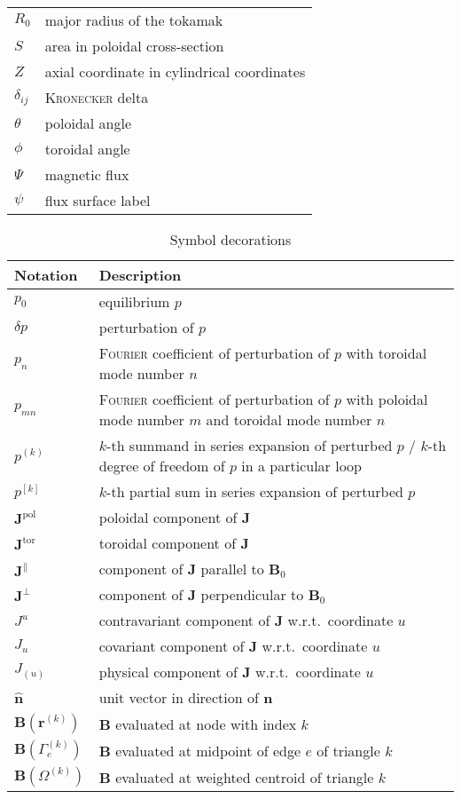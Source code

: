 \documentclass[a4paper, twoside, 10pt, english]{article}
\numberwithin{equation}{section}
\let\temp\varrho
\let\varrho\rho
\let\rho\temp
\let\temp\vartheta
\let\vartheta\theta
\let\theta\temp
\let\temp\varphi
\let\varphi\phi
\let\phi\temp
\let\vec\symbf
\newcommand*\pol{\ensuremath{\textrm{pol}}}  %
\newcommand*\tor{\ensuremath{\textrm{tor}}}  %
\begin{document}
\begin{longtable}{l >{\RaggedRight}p{}}
  $R_{0}$ & major radius of the tokamak \\
  $S$ & area in poloidal cross-section \\
  $Z$ & axial coordinate in cylindrical coordinates \\
  $\delta_{ij}$ & \textsc{Kronecker} delta \\
  $\theta$ & poloidal angle \\
  $\phi$ & toroidal angle \\
  $\Psi$ & magnetic flux \\
  $\psi$ & flux surface label \\
  \bottomrule
\end{longtable}

\begin{longtable}{l >{\RaggedRight}p{}}
  \caption{Symbol decorations} \\
  \toprule
  \textbf{Notation} & \textbf{Description} \\
  \midrule
  \endhead
  $p_{0}$ & equilibrium $p$ \\
  $\delta p$ & perturbation of $p$ \\
  $p_{n}$ & \textsc{Fourier} coefficient of perturbation of $p$ with toroidal mode number $n$ \\
  $p_{m n}$ & \textsc{Fourier} coefficient of perturbation of $p$ with poloidal mode number $m$ and toroidal mode number $n$ \\
  $p^{(k)}$ & $k$-th summand in series expansion of perturbed $p$ / $k$-th degree of freedom of $p$ in a particular loop \\
  $p^{[k]}$ & $k$-th partial sum in series expansion of perturbed $p$ \\
  \midrule
  $\vec{J}^{\pol}$ & poloidal component of $\vec{J}$ \\
  $\vec{J}^{\tor}$ & toroidal component of $\vec{J}$ \\
  $\vec{J}^{\parallel}$ & component of $\vec{J}$ parallel to $\vec{B}_{0}$ \\
  $\vec{J}^{\perp}$ & component of $\vec{J}$ perpendicular to $\vec{B}_{0}$ \\
  $J^{u}$ & contravariant component of $\vec{J}$ w.r.t.\ coordinate $u$ \\
  $J_{u}$ & covariant component of $\vec{J}$ w.r.t.\ coordinate $u$ \\
  $J_{(u)}$ & physical component of $\vec{J}$ w.r.t.\ coordinate $u$ \\
  $\hat{\vec{n}}$ & unit vector in direction of $\vec{n}$ \\
  \midrule
  $\vec{B} (\vec{r}^{(k)})$ & $\vec{B}$ evaluated at node with index $k$ \\
  $\vec{B} (\Gamma_{e}^{(k)})$ & $\vec{B}$ evaluated at midpoint of edge $e$ of triangle $k$ \\
  $\vec{B} (\Omega^{(k)})$ & $\vec{B}$ evaluated at weighted centroid of triangle $k$ \\
  \bottomrule
\end{longtable}
\end{document}
